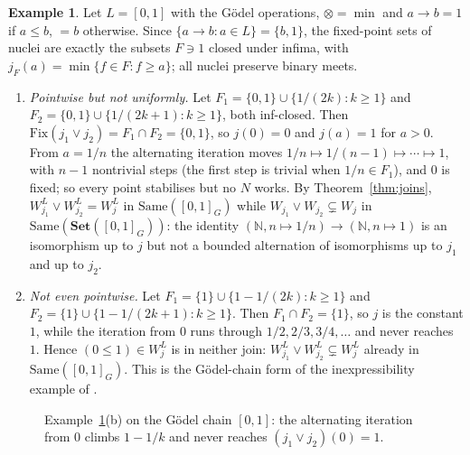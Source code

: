 \documentclass[11pt]{amsart}
\theoremstyle{definition}
\newtheorem{ex}[thm]{Example}
\newcommand{\Fix}{\mathrm{Fix}}
\newcommand{\Same}{\mathrm{Same}}
\newcommand{\FSet}{\mathbf{Set}}
\begin{document}
\begin{ex}\label{ex:godel}
Let $L=[0,1]$ with the G\"odel operations, $\otimes=\min$ and $a\to b=1$ if
$a\le b$, $=b$ otherwise. Since $\{a\to b:a\in L\}=\{b,1\}$, the fixed-point
sets of nuclei are exactly the subsets $F\ni1$ closed under infima, with
$j_F(a)=\min\{f\in F:f\ge a\}$; all nuclei preserve binary meets.
\begin{enumerate}
\item[(a)] \emph{Pointwise but not uniformly.} Let
$F_1=\{0,1\}\cup\{1/(2k):k\ge1\}$ and $F_2=\{0,1\}\cup\{1/(2k+1):k\ge1\}$,
both inf-closed. Then $\Fix(j_1\vee j_2)=F_1\cap F_2=\{0,1\}$, so $j(0)=0$
and $j(a)=1$ for $a>0$. From $a=1/n$ the alternating iteration moves
$1/n\mapsto1/(n-1)\mapsto\cdots\mapsto1$, with $n-1$ nontrivial steps (the
first step is trivial when $1/n\in F_1$), and $0$ is fixed;
so every point stabilises but no $N$ works. By Theorem~\ref{thm:joins},
$W^L_{j_1}\vee W^L_{j_2}=W^L_j$ in $\Same([0,1]_G)$ while $W_{j_1}\vee W_{j_2}
\subsetneq W_j$ in $\Same(\FSet([0,1]_G))$: the identity
$(\mathbb N,n\mapsto1/n)\to(\mathbb N,n\mapsto1)$ is an isomorphism up to
$j$ but not a bounded alternation of isomorphisms up to $j_1$ and up to $j_2$.
\item[(b)] \emph{Not even pointwise.} Let $F_1=\{1\}\cup\{1-1/(2k):k\ge1\}$
and $F_2=\{1\}\cup\{1-1/(2k+1):k\ge1\}$. Then $F_1\cap F_2=\{1\}$, so
$j$ is the constant $1$, while the iteration from $0$ runs through
$1/2,2/3,3/4,\dots$ and never reaches $1$. Hence $(0\le1)\in W^L_j$ is in
neither join: $W^L_{j_1}\vee W^L_{j_2}\subsetneq W^L_j$ already in
$\Same([0,1]_G)$. This is the G\"odel-chain form of the inexpressibility
example of \cite[\S5]{Laxjoin}.
\end{enumerate}
\end{ex}

\begin{figure}[ht]
\centering
{}
\caption{Example~\ref{ex:godel}(b) on the G\"odel chain $[0,1]$: the
alternating iteration from $0$ climbs $1-1/k$ and never reaches
$(j_1\vee j_2)(0)=1$.}
\label{fig:godel}
\end{figure}
\end{document}
